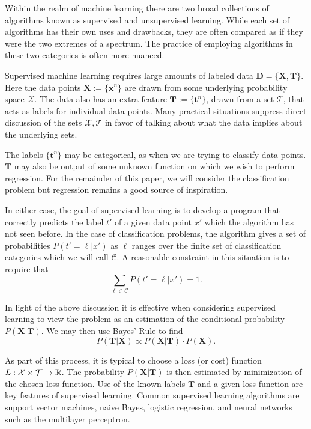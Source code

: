 \label{supVunsup}
Within the realm of machine learning there are two broad collections of 
algorithms known as supervised and unsupervised learning. While each set of 
algorithms has their own uses and drawbacks, they are often compared as if 
they were the two extremes of a spectrum. The practice of employing algorithms 
in these two categories is often more nuanced.

Supervised machine learning requires large amounts of labeled data 
$\bm{D}=\{\bm{X},\bm{T}\}$.  Here the data points \( \bm X :=\{\bm x^{n}\}\) are drawn from some underlying probability space \( \mathcal{X} \). The data also has an extra feature 
$\bm{T}:=\{\bm t^n\}$, drawn from a set \( \mathcal{T} \), that acts as labels for individual data points. Many practical situations suppress direct discussion of the sets \( \mathcal{X},\mathcal{T} \) in favor of talking about what the data implies about the underlying sets.

The labels \(\{\bm t^n\}\) may be categorical, as when we are trying to classify data points.  
$\bm{T}$ may also be output of some unknown function on which we wish to 
perform regression. For the remainder of this paper, we will consider the 
classification problem but regression remains a good source of inspiration.

In either case, the goal of supervised learning is to develop a program that
correctly predicts the label $t'$ of a given data point $x'$ which the algorithm has not seen before. In the case of classification problems, the algorithm gives a set of 
probabilities $P(t'=\ell|x')$ as $\ell$ ranges over the finite set of 
classification categories which we will call $\mathcal{C}$. A reasonable 
constraint in this situation is to require that 
\[\sum_{\ell\in\mathcal{C}}P(t'=\ell|x') = 1.\]

In light of the above discussion it is effective when considering supervised 
learning to view the problem as an estimation of the conditional probability 
$P(\bm{X}|\bm{T})$. We may then use Bayes' Rule to find 
\[P(\bm T|\bm X)\propto P(\bm X|\bm T)\cdot P(\bm X).\]


As part of this process, it is typical to choose a loss (or cost) function 
$L:\mathcal{X}\times\mathcal{T}\rightarrow \mathbb R$.  The probability 
$P(\bm{X}|\bm{T})$ is then estimated by minimization of the chosen 
loss function. Use of the known labels \( \bm T \) and a given loss function are key features of supervised learning. Common supervised learning algorithms are support vector machines, naive Bayes, logistic regression, and  neural networks such as the multilayer perceptron.

